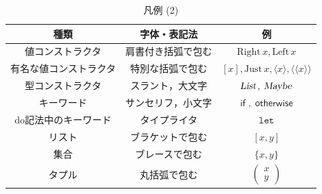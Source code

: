\documentclass[a5paper,twoside,fleqn,draft]{jsbook}
\newcommand{\Langle}{\langle\!\langle}
\newcommand{\Rangle}{\rangle\!\rangle}
\newcommand{\mKeyword}[1]{\mathsf{#1}}
\newcommand{\mVarKeyword}[1]{\texttt{#1}}
\newcommand{\mDoLetKeyword}{\mVarKeyword{let}}
\newcommand{\mIfKeyword}{\mKeyword{if}}
\newcommand{\mOtherwiseKeyword}{\mKeyword{otherwise}}
\DeclareMathOperator{\mIf}{\mIfKeyword}
\DeclareMathOperator{\mOtherwise}{\mOtherwiseKeyword}
\newcommand{\mTypeConstructor}[1]{\textsl{#1}}
\DeclareMathOperator{\mListTypeConstructor}{\mTypeConstructor{List}}
\DeclareMathOperator{\mMaybeTypeConstructor}{\mTypeConstructor{Maybe}}
\newcommand{\mValueConstructor}[1]{\mathrm{#1}}
\newcommand{\mValueWith}[2]{\mValueConstructor{#1}\,#2}
\newcommand{\mLeftWith}[1]{\mValueWith{Left}{#1}}
\newcommand{\mRightWith}[1]{\mValueWith{Right}{#1}}
\newcommand{\mJustWith}[1]{\mValueWith{Just}{#1}}
\newcommand{\mArrowWith}[1]{\Langle#1\Rangle}
\newcommand{\mFuncWith}[1]{\langle#1\rangle}
\newcommand{\mPairWith}[2]{\begin{pmatrix}#1\\#2\end{pmatrix}}
\begin{document}
\begin{table}[p]
\caption{凡例 (2)}
\begin{center}
\begin{tabular}{||c|c|c||}
\hline
種類&字体・表記法&例\\
\hline\hline
値コンストラクタ&肩書付き括弧で包む&$\mRightWith{x},\mLeftWith{x}$\\
有名な値コンストラクタ&特別な括弧で包む&$[x],\mJustWith{x},\mFuncWith{x},\mArrowWith{x}$\\
\hline
型コンストラクタ&スラント，大文字&$\mListTypeConstructor$, $\mMaybeTypeConstructor$\\
\hline
キーワード&サンセリフ，小文字&$\mIf,\mOtherwise$\\
do記法中のキーワード&タイプライタ&$\mDoLetKeyword$\\
\hline
リスト&ブラケットで包む&$[x,y]$\\
集合&ブレースで包む&$\{x,y\}$\\
タプル&丸括弧で包む&$\mPairWith{x}{y}$\\
\hline
\end{tabular}
\end{center}
\end{table}
\end{document}
